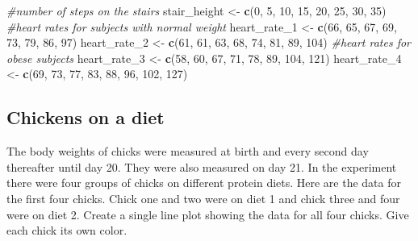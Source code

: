 \documentclass[]{book}
\newenvironment{Shaded}{\begin{snugshade}}{\end{snugshade}}
\newcommand{\CommentTok}[1]{\textcolor[rgb]{0.56,0.35,0.01}{\textit{#1}}}
\newcommand{\DecValTok}[1]{\textcolor[rgb]{0.00,0.00,0.81}{#1}}
\newcommand{\KeywordTok}[1]{\textcolor[rgb]{0.13,0.29,0.53}{\textbf{#1}}}
\newcommand{\NormalTok}[1]{#1}
\newcommand{\StringTok}[1]{\textcolor[rgb]{0.31,0.60,0.02}{#1}}
\begin{document}
\begin{Shaded}
\begin{Highlighting}[]
\CommentTok{#number of steps on the stairs}
\NormalTok{stair_height <-}\StringTok{ }\KeywordTok{c}\NormalTok{(}\DecValTok{0}\NormalTok{, }\DecValTok{5}\NormalTok{, }\DecValTok{10}\NormalTok{, }\DecValTok{15}\NormalTok{, }\DecValTok{20}\NormalTok{, }\DecValTok{25}\NormalTok{, }\DecValTok{30}\NormalTok{, }\DecValTok{35}\NormalTok{)}
\CommentTok{#heart rates for subjects with normal weight}
\NormalTok{heart_rate_}\DecValTok{1}\NormalTok{ <-}\StringTok{ }\KeywordTok{c}\NormalTok{(}\DecValTok{66}\NormalTok{, }\DecValTok{65}\NormalTok{, }\DecValTok{67}\NormalTok{, }\DecValTok{69}\NormalTok{, }\DecValTok{73}\NormalTok{, }\DecValTok{79}\NormalTok{, }\DecValTok{86}\NormalTok{, }\DecValTok{97}\NormalTok{)}
\NormalTok{heart_rate_}\DecValTok{2}\NormalTok{ <-}\StringTok{ }\KeywordTok{c}\NormalTok{(}\DecValTok{61}\NormalTok{, }\DecValTok{61}\NormalTok{, }\DecValTok{63}\NormalTok{, }\DecValTok{68}\NormalTok{, }\DecValTok{74}\NormalTok{, }\DecValTok{81}\NormalTok{, }\DecValTok{89}\NormalTok{, }\DecValTok{104}\NormalTok{)}
\CommentTok{#heart rates for obese subjects}
\NormalTok{heart_rate_}\DecValTok{3}\NormalTok{ <-}\StringTok{ }\KeywordTok{c}\NormalTok{(}\DecValTok{58}\NormalTok{, }\DecValTok{60}\NormalTok{, }\DecValTok{67}\NormalTok{, }\DecValTok{71}\NormalTok{, }\DecValTok{78}\NormalTok{, }\DecValTok{89}\NormalTok{, }\DecValTok{104}\NormalTok{, }\DecValTok{121}\NormalTok{)}
\NormalTok{heart_rate_}\DecValTok{4}\NormalTok{ <-}\StringTok{ }\KeywordTok{c}\NormalTok{(}\DecValTok{69}\NormalTok{, }\DecValTok{73}\NormalTok{, }\DecValTok{77}\NormalTok{, }\DecValTok{83}\NormalTok{, }\DecValTok{88}\NormalTok{, }\DecValTok{96}\NormalTok{, }\DecValTok{102}\NormalTok{, }\DecValTok{127}\NormalTok{)}
\end{Highlighting}
\end{Shaded}

\hypertarget{chickens-on-a-diet}{%
\subsection{Chickens on a diet}\label{chickens-on-a-diet}}

The body weights of chicks were measured at birth and every second day thereafter until day 20. They were also measured on day 21. In the experiment there were four groups of chicks on different protein diets. Here are the data for the first four chicks. Chick one and two were on diet 1 and chick three and four were on diet 2. Create a single line plot showing the data for all four chicks. Give each chick its own color.
\end{document}
